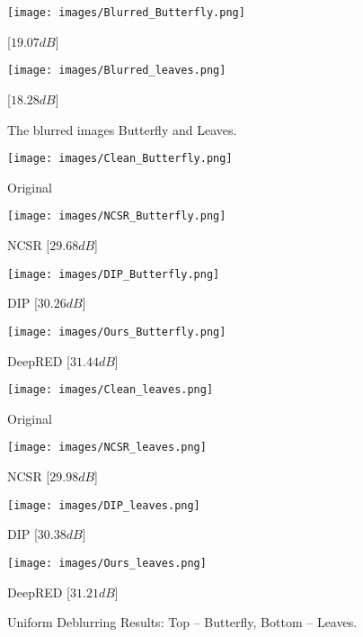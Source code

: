 \documentclass[12pt]{article}
\begin{document}
\begin{figure}[t]
    \centering
      \texttt{[image: images/Blurred\_Butterfly.png]}
      \caption*{[$19.07dB$]}
    \endminipage
    \hspace{0.01\linewidth}
    \texttt{[image: images/Blurred\_leaves.png]}
      \caption*{[$18.28dB$]}
    \endminipage
    \caption{The blurred images \textsf{Butterfly} and \textsf{Leaves}.}
    \label{fig:blurred_images_uniform}
\end{figure}

\begin{figure*}[!ht]
\texttt{[image: images/Clean\_Butterfly.png]}
  \caption*{Original}
\endminipage
\hspace{0.005\textwidth}
\texttt{[image: images/NCSR\_Butterfly.png]}
  \caption*{NCSR [$29.68dB$]}
\endminipage
\hspace{0.005\textwidth}
\texttt{[image: images/DIP\_Butterfly.png]}
  \caption*{DIP [$30.26dB$]}
\endminipage
\hspace{0.005\textwidth}
\texttt{[image: images/Ours\_Butterfly.png]}
  \caption*{DeepRED [$31.44dB$]}
  \endminipage

\texttt{[image: images/Clean\_leaves.png]}
  \caption*{Original}
\endminipage
\hspace{0.005\textwidth}
\texttt{[image: images/NCSR\_leaves.png]}
  \caption*{NCSR [$29.98dB$]}
\endminipage
\hspace{0.005\textwidth}
\texttt{[image: images/DIP\_leaves.png]}
  \caption*{DIP [$30.38dB$]}
\endminipage
\hspace{0.005\textwidth}
\texttt{[image: images/Ours\_leaves.png]}
  \caption*{DeepRED [$31.21dB$]}
  \endminipage

\caption{Uniform Deblurring Results: Top -- \textsf{Butterfly}, Bottom -- \textsf{Leaves}.}
\label{fig:deblur_uniform}
\end{figure*}
\end{document}
